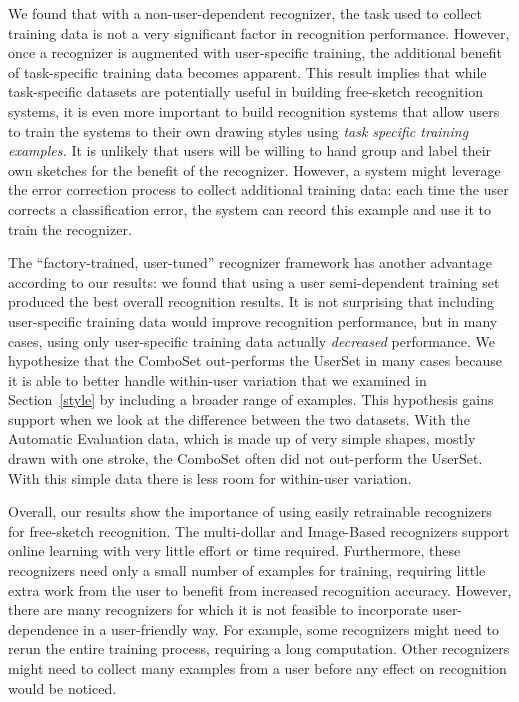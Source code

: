 \documentclass[final,5p,twocolumn]{elsarticle}
\begin{document}
We found that with a non-user-dependent recognizer, the task used to 
collect training data is not a very significant factor in recognition
performance. However, once a recognizer is augmented with user-specific
training, the additional benefit of task-specific training data becomes
apparent.  This result implies that while task-specific datasets are 
potentially useful in building free-sketch recognition systems, it is even 
more important to build recognition systems that allow users to train 
the systems to their own drawing styles using \emph{task specific training
examples.}  It is unlikely that users will be willing to hand group and label 
their own sketches for the benefit of the recognizer.  However, a system might 
leverage the error correction process
to collect additional training data: each time the user corrects a classification
error, the system can record this example and use it to train the 
recognizer.

The ``factory-trained, user-tuned'' recognizer framework has another advantage 
according to our results: we found that using a user semi-dependent training set
produced the best overall recognition results.  It is not surprising that including 
user-specific training data would improve recognition performance, but in many cases, 
using only user-specific training data actually \emph{decreased} performance.  We 
hypothesize that the ComboSet out-performs the UserSet in many cases because it is able 
to better handle within-user variation that we examined in Section~\ref{style} by including
a broader range of examples.  This hypothesis gains support when we look at the difference
between the two datasets.  With the Automatic Evaluation data, which is made up of 
very simple shapes, mostly drawn with one stroke, the ComboSet often did not out-perform
the UserSet.  With this simple data there is less room for within-user variation.


Overall, our results show the importance of using easily retrainable
recognizers for free-sketch recognition.  The multi-dollar and Image-Based
recognizers support online learning with very little effort or time
required. Furthermore, these recognizers need only a small number of
examples for training, requiring little extra work from the user to
benefit from increased recognition accuracy. However, there are many
recognizers for which it is not feasible to incorporate
user-dependence in a user-friendly way. For example, some recognizers
might need to rerun the entire training process, requiring a long
computation. Other recognizers might need to collect many examples
from a user before any effect on recognition would be noticed. 
\end{document}
